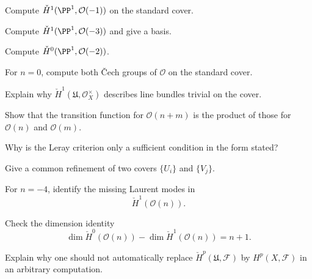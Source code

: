 \begin{exercise}\label{exr:vi47-13}
Compute $\check H^1(\PP^1,\mathcal O(-1))$ on the standard cover.
\end{exercise}

\begin{exercise}\label{exr:vi47-14}
Compute $\check H^1(\PP^1,\mathcal O(-3))$ and give a basis.
\end{exercise}

\begin{exercise}\label{exr:vi47-15}
Compute $\check H^0(\PP^1,\mathcal O(-2))$.
\end{exercise}

\begin{exercise}\label{exr:vi47-16}
For $n=0$, compute both \v{C}ech groups of $\mathcal O$ on the standard cover.
\end{exercise}

\begin{exercise}\label{exr:vi47-17}
Explain why $\check H^1(\mathfrak U,\mathcal O_X^\times)$ describes line bundles trivial on the cover.
\end{exercise}

\begin{exercise}\label{exr:vi47-18}
Show that the transition function for $\mathcal O(n+m)$ is the product of those for $\mathcal O(n)$ and $\mathcal O(m)$.
\end{exercise}

\begin{exercise}\label{exr:vi47-19}
Why is the Leray criterion only a sufficient condition in the form stated?
\end{exercise}

\begin{exercise}\label{exr:vi47-20}
Give a common refinement of two covers $\{U_i\}$ and $\{V_j\}$.
\end{exercise}

\begin{exercise}\label{exr:vi47-21}
For $n=-4$, identify the missing Laurent modes in
\[
\check H^1(\mathcal O(n)).
\]
\end{exercise}

\begin{exercise}\label{exr:vi47-22}
Check the dimension identity
\[
\dim\check H^0(\mathcal O(n))-\dim\check H^1(\mathcal O(n))=n+1.
\]
\end{exercise}

\begin{exercise}\label{exr:vi47-23}
Explain why one should not automatically replace $\check H^p(\mathfrak U,\mathcal F)$ by $H^p(X,\mathcal F)$ in an arbitrary computation.
\end{exercise}

